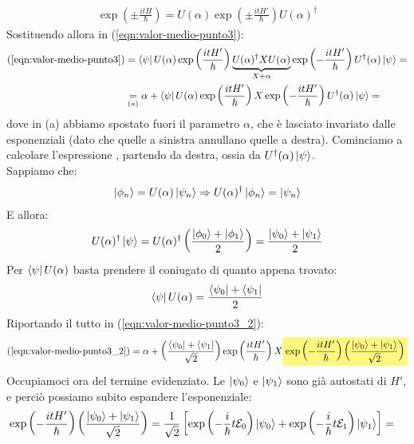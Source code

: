 \documentclass[../../FisicaTeorica.tex]{subfiles}
\begin{document}
\begin{enumerate}
\begin{align*}
\exp\left(\pm \frac{itH}{\hbar}\right) = U(\alpha) \exp\left(\pm \frac{itH'}{\hbar}\right) U(\alpha)^\dag
\end{align*}
Sostituendo allora in (\ref{eqn:valor-medio-punto3}):
\begin{align}\nonumber
(\ref{eqn:valor-medio-punto3}) &= \Bra{\psi}U(\alpha) \exp\left(\frac{itH'}{\hbar}\right) \underbrace{U(\alpha)^\dag X U(\alpha) }_{X+\alpha}\exp\left(-\frac{itH'}{\hbar}\right) U^\dag(\alpha)\Ket{\psi} =\\
&\underset{(a)}{=} \alpha + \Bra{\psi}U(\alpha) \exp\left(\frac{itH'}{\hbar}\right) X \exp\left(-\frac{itH'}{\hbar}\right) U^\dag(\alpha)\Ket{\psi} = \label{eqn:valor-medio-punto3_2}
\end{align}
dove in (a) abbiamo spostato fuori il parametro $\alpha$, che è lasciato invariato dalle esponenziali (dato che quelle a sinistra annullano quelle a destra).
Cominciamo a calcolare l'espressione , partendo da destra, ossia da $U^\dag(\alpha)\Ket{\psi}$.\\
Sappiamo che:
\begin{align*}
\Ket{\phi_n} = U(\alpha)\Ket{\psi_n}\Rightarrow  U(\alpha)^\dag \Ket{\phi_n} =\Ket{\psi_n}
\end{align*}
E allora:
\begin{align*}
U(\alpha)^\dag \Ket{\psi} = U(\alpha)^\dag \left(\frac{\Ket{\phi_0}+\Ket{\phi_1}}{2}\right) = \frac{\Ket{\psi_0}+\Ket{\psi_1}}{2}
\end{align*}
Per $\Bra{\psi}U(\alpha)$ basta prendere il coniugato di quanto appena trovato:
\begin{align*}
\Bra{\psi}U(\alpha)=\frac{\Bra{\psi_0}+\Bra{\psi_1}}{2}
\end{align*}
Riportando il tutto in (\ref{eqn:valor-medio-punto3_2}):
\begin{align}
(\ref{eqn:valor-medio-punto3_2}) = \alpha + \left(\frac{\bra{\psi_0}+ \bra{\psi_1}}{\sqrt{2}}\right) \exp\left(\frac{itH'}{\hbar}\right) X \hlc{Yellow}{\exp\left(- \frac{itH'}{\hbar}\right)
\left( \frac{\ket{\psi_0}+\ket{\psi_1}}{\sqrt{2}}\right)}
\label{eqn:valor-medio-punto3_3}
\end{align}
Occupiamoci ora del termine evidenziato. Le $\Ket{\psi_0}$ e $\Ket{\psi_1}$ sono già autostati di $H'$, e perciò possiamo subito espandere l'esponenziale:
\begin{align*}
\exp\left(-\frac{itH'}{\hbar}\right) \left(
\frac{\ket{\psi_0}+\ket{\psi_1}}{\sqrt{2}}\right) &=
\frac{1}{\sqrt{2}}\left[\exp\left(-\frac{i}{\hbar}t\mathcal{E}_0\right)\ket{\psi_0} + \exp\left(-\frac{i}{\hbar}t \mathcal{E}_1\right)\ket{\psi_1} \right] =

\end{align*}
\end{enumerate}
\end{document}
